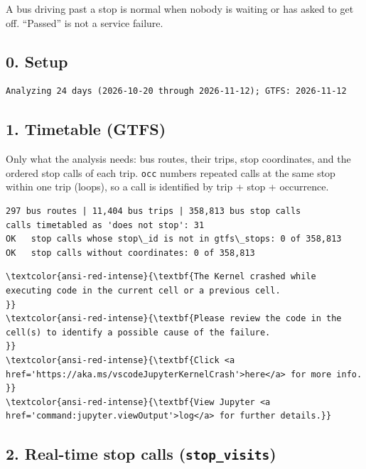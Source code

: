 \documentclass[11pt]{article}
\begin{document}
A bus driving past a stop is normal when nobody is waiting or has asked
to get off. ``Passed'' is not a service failure.

    \subsection{0. Setup}\label{setup}

    \begin{Verbatim}[commandchars=\\\{\}]
Analyzing 24 days (2026-10-20 through 2026-11-12); GTFS: 2026-11-12
    \end{Verbatim}

    \subsection{1. Timetable (GTFS)}\label{timetable-gtfs}

Only what the analysis needs: bus routes, their trips, stop coordinates,
and the ordered stop calls of each trip. \texttt{occ} numbers repeated
calls at the same stop within one trip (loops), so a call is identified
by trip + stop + occurrence.

    \begin{Verbatim}[commandchars=\\\{\}]
297 bus routes | 11,404 bus trips | 358,813 bus stop calls
calls timetabled as 'does not stop': 31
OK   stop calls whose stop\_id is not in gtfs\_stops: 0 of 358,813
OK   stop calls without coordinates: 0 of 358,813
    \end{Verbatim}

    \begin{Verbatim}[commandchars=\\\{\}, frame=single, framerule=2mm, rulecolor=\color{outerrorbackground}]
\textcolor{ansi-red-intense}{\textbf{The Kernel crashed while executing code in the current cell or a previous cell. 
}}
\textcolor{ansi-red-intense}{\textbf{Please review the code in the cell(s) to identify a possible cause of the failure. 
}}
\textcolor{ansi-red-intense}{\textbf{Click <a href='https://aka.ms/vscodeJupyterKernelCrash'>here</a> for more info. 
}}
\textcolor{ansi-red-intense}{\textbf{View Jupyter <a href='command:jupyter.viewOutput'>log</a> for further details.}}
    \end{Verbatim}

    \subsection{\texorpdfstring{2. Real-time stop calls
(\texttt{stop\_visits})}{2. Real-time stop calls (stop\_visits)}}\label{real-time-stop-calls-stop_visits}
\end{document}
